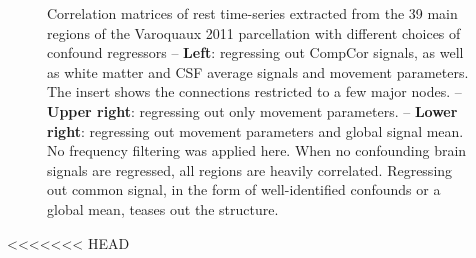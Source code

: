 \documentclass[5p]{elsarticle}
\begin{document}
\begin{figure}

\caption{
Correlation matrices of rest time-series extracted from the 39 main
regions of the Varoquaux 2011 \cite{varoquaux2011} parcellation with
different choices of confound regressors -- 
\textbf{Left}: regressing out CompCor signals, as well as white matter and
CSF average signals and movement parameters. The insert shows the
connections restricted to a few major nodes.
-- \textbf{Upper right}: regressing out only movement parameters. -- 
\textbf{Lower right}:
regressing out movement parameters and global signal mean.
No frequency filtering was applied here.
\label{fig:correlation_matrices}
When no confounding brain signals are regressed, all regions are heavily
correlated. Regressing out common signal, in the form of well-identified
confounds or a global mean, teases out the structure.
}
\end{figure}



<<<<<<< HEAD
\end{document}
